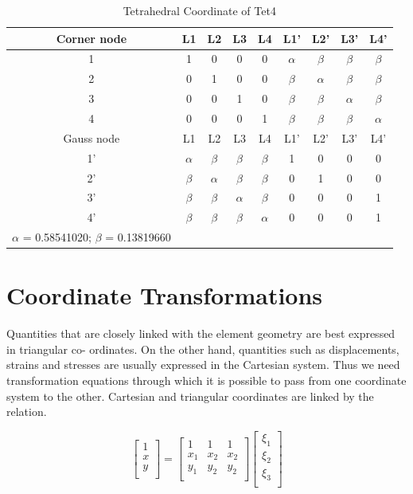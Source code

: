 \begin{table}
	\centering
	\caption{Tetrahedral Coordinate of Tet4}
	\begin{tabular}{ccccccccc}			
		\hline
		Corner node\centering& L1& L2& L3& L4& L1'& L2'& L3'& L4'\\ \hline
		1\centering& 1& 0& 0& 0& $\alpha$& $\beta$& $\beta$& $\beta$\\
		2\centering& 0& 1& 0& 0& $\beta$& $\alpha$& $\beta$& $\beta$\\
		3\centering& 0& 0& 1& 0& $\beta$& $\beta$& $\alpha$& $\beta$\\
		4\centering& 0& 0& 0& 1& $\beta$& $\beta$& $\beta$& $\alpha$\\
		\hline
		Gauss node\centering& L1& L2& L3& L4& L1'& L2'& L3'& L4' \\ \hline
		1'\centering& $\alpha$& $\beta$& $\beta$& $\beta$& 1& 0& 0& 0  \\
		2'\centering&$\beta$ & $\alpha$& $\beta$& $\beta$& 0& 1& 0& 0 \\
		3'\centering& $\beta$& $\beta$& $\alpha$& $\beta$& 0& 0& 0& 1\\
		4'\centering& $\beta$& $\beta$& $\beta$& $\alpha$& 0& 0& 0& 1\\
		\hline
		$\alpha$ = 0.58541020; $\beta$ = 0.13819660&&&&&&&&\\
		\hline 		    
	\end{tabular}	
\end{table}		



\section{Coordinate Transformations}
Quantities that are closely linked with the element geometry are best expressed in triangular co- ordinates. On the other hand, quantities such as displacements, strains and stresses are usually expressed in the Cartesian system. Thus we need transformation equations through which it is possible to pass from one coordinate system to the other.
Cartesian and triangular coordinates are linked by the relation.

\begin{equation}
\begin{bmatrix}
1 \\
x \\
y \\
\end{bmatrix}
= 
\begin{bmatrix}
1&1&1 \\
x_1&x_2&x_2 \\
y_1&y_2&y_2 \\
\end{bmatrix}
\begin{bmatrix}
\xi_1 \\
\xi_2 \\
\xi_3 \\
\end{bmatrix}
\end{equation}

